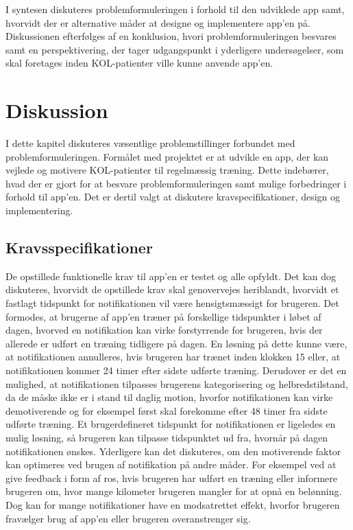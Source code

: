 I syntesen diskuteres problemformuleringen i forhold til den udviklede app samt, hvorvidt der er alternative måder at designe og implementere app'en på. Diskussionen efterfølges af en konklusion, hvori problemformuleringen besvares samt en perspektivering, der tager udgangspunkt i yderligere undersøgelser, som skal foretages inden KOL-patienter ville kunne anvende app'en.

\section{Diskussion}
I dette kapitel diskuteres væsentlige problemstillinger forbundet med problemformuleringen. Formålet med projektet er at udvikle en app, der kan vejlede og motivere KOL-patienter til regelmæssig træning. Dette indebærer, hvad der er gjort for at besvare problemformuleringen samt mulige forbedringer i forhold til app'en. Det er dertil valgt at diskutere kravspecifikationer, design og implementering.

\subsection{Kravsspecifikationer}
De opstillede funktionelle krav til app’en er testet og alle opfyldt. Det kan dog diskuteres, hvorvidt de opstillede krav skal genovervejes heriblandt, hvorvidt et fastlagt tidspunkt for notifikationen vil være hensigtsmæssigt for brugeren. Det formodes, at brugerne af app’en træner på forskellige tidspunkter i løbet af dagen, hvorved en notifikation kan virke forstyrrende for brugeren, hvis der allerede er udført en træning tidligere på dagen. En løsning på dette kunne være, at notifikationen annulleres, hvis brugeren har trænet inden klokken 15 eller, at notifikationen kommer 24 timer efter sidste udførte træning. Derudover er det en mulighed, at notifikationen tilpasses brugerens kategorisering og helbredstilstand, da de måske ikke er i stand til daglig motion, hvorfor notifikationen kan virke demotiverende og for eksempel først skal forekomme efter 48 timer fra sidste udførte træning. Et brugerdefineret tidspunkt for notifikationen er ligeledes en mulig løsning, så brugeren kan tilpasse tidspunktet ud fra, hvornår på dagen notifikationen ønskes. 
Yderligere kan det diskuteres, om den motiverende faktor kan optimeres ved brugen af notifikation på andre måder. For eksempel ved at give feedback i form af ros, hvis brugeren har udført en træning eller informere brugeren om, hvor mange kilometer brugeren mangler for at opnå en belønning. Dog kan for mange notifikationer have en modsatrettet effekt, hvorfor brugeren fravælger brug af app’en eller brugeren overanstrenger sig. 

